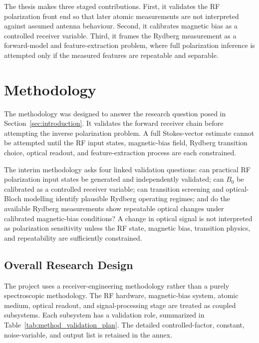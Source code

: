 \documentclass{ieeeaccess}
\begin{document}
The thesis makes three staged contributions. First, it validates the RF polarization front end so that later atomic measurements are not interpreted against assumed antenna behaviour. Second, it calibrates magnetic bias as a controlled receiver variable. Third, it frames the Rydberg measurement as a forward-model and feature-extraction problem, where full polarization inference is attempted only if the measured features are repeatable and separable.

\section{Methodology}
\label{sec:methodology}

The methodology was designed to answer the research question posed in Section~\ref{sec:introduction}. It validates the forward receiver chain before attempting the inverse polarization problem. A full Stokes-vector estimate cannot be attempted until the RF input states, magnetic-bias field, Rydberg transition choice, optical readout, and feature-extraction process are each constrained.

The interim methodology asks four linked validation questions: can practical RF polarization input states be generated and independently validated; can \(B_0\) be calibrated as a controlled receiver variable; can transition screening and optical-Bloch modelling identify plausible Rydberg operating regimes; and do the available Rydberg measurements show repeatable optical changes under calibrated magnetic-bias conditions? A change in optical signal is not interpreted as polarization sensitivity unless the RF state, magnetic bias, transition physics, and repeatability are sufficiently constrained.

\subsection{Overall Research Design}
\label{subsec:method_overall_design}

The project uses a receiver-engineering methodology rather than a purely spectroscopic methodology. The RF hardware, magnetic-bias system, atomic medium, optical readout, and signal-processing stage are treated as coupled subsystems. Each subsystem has a validation role, summarized in Table~\ref{tab:method_validation_plan}. The detailed controlled-factor, constant, noise-variable, and output list is retained in the annex.
\end{document}
